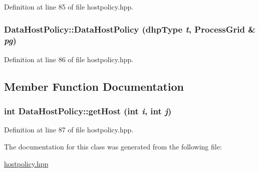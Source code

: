 Definition at line 85 of file hostpolicy.hpp.\hypertarget{class_data_host_policy_a64bd8132dbd59bf8939e9e8f25d5b3c3}{
\subsubsection[{DataHostPolicy}]{\setlength{\rightskip}{0pt plus 5cm}DataHostPolicy::DataHostPolicy ({\bf dhpType} {\em t}, \/  {\bf ProcessGrid} \& {\em pg})}}
\label{class_data_host_policy_a64bd8132dbd59bf8939e9e8f25d5b3c3}


Definition at line 86 of file hostpolicy.hpp.

\subsection{Member Function Documentation}
\hypertarget{class_data_host_policy_a6117b250bbf462c0935362e45855be1e}{
\subsubsection[{getHost}]{\setlength{\rightskip}{0pt plus 5cm}int DataHostPolicy::getHost (int {\em i}, \/  int {\em j})}}
\label{class_data_host_policy_a6117b250bbf462c0935362e45855be1e}


Definition at line 87 of file hostpolicy.hpp.

The documentation for this class was generated from the following file:\begin{DoxyCompactItemize}
\item 
\hyperlink{hostpolicy_8hpp}{hostpolicy.hpp}\end{DoxyCompactItemize}
